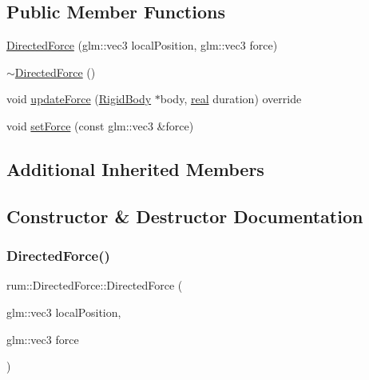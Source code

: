 \subsection*{Public Member Functions}
\begin{DoxyCompactItemize}
\item 
\mbox{\hyperlink{classrum_1_1_directed_force_ac6be6fbfe8f21ed2c6c3cf050ac180b8}{Directed\+Force}} (glm\+::vec3 local\+Position, glm\+::vec3 force)
\item 
\mbox{\hyperlink{classrum_1_1_directed_force_a6da6baf550b205f22f3c95d7140334c0}{$\sim$\+Directed\+Force}} ()
\item 
void \mbox{\hyperlink{classrum_1_1_directed_force_af775ae939b728dadcfcfa6d6719c6015}{update\+Force}} (\mbox{\hyperlink{classrum_1_1_rigid_body}{Rigid\+Body}} $\ast$body, \mbox{\hyperlink{namespacerum_a7e8cca23573d5eaead0f138cbaa4862c}{real}} duration) override
\item 
void \mbox{\hyperlink{classrum_1_1_directed_force_a733506320db57779ed18af5cad38e2dc}{set\+Force}} (const glm\+::vec3 \&force)
\end{DoxyCompactItemize}
\subsection*{Additional Inherited Members}


\subsection{Constructor \& Destructor Documentation}
\mbox{\label{classrum_1_1_directed_force_ac6be6fbfe8f21ed2c6c3cf050ac180b8}} 
\subsubsection{\texorpdfstring{Directed\+Force()}{DirectedForce()}}
{\footnotesize\ttfamily rum\+::\+Directed\+Force\+::\+Directed\+Force (\begin{DoxyParamCaption}\item[{glm\+::vec3}]{local\+Position,  }\item[{glm\+::vec3}]{force }\end{DoxyParamCaption})}

\mbox{\label{classrum_1_1_directed_force_a6da6baf550b205f22f3c95d7140334c0}} 
